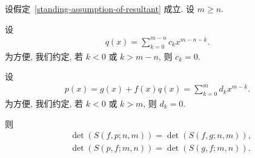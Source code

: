 \documentclass[../libro.tex]{subfiles}
\begin{document}
\begin{theorem}
    设假定~\ref{standing-assumption-of-resultant} 成立.
    设 \(m \geq n\).

    设
    \begin{align*}
        q(x) = \sum_{k = 0}^{m-n} {c_k x^{m-n-k}}.
    \end{align*}
    为方便, 我们约定,
    若 \(k < 0\) 或 \(k > m - n\), 则 \(c_k = 0\).

    设
    \begin{align*}
        p(x) = g(x) + f(x) q(x) = \sum_{k = 0}^{m} {d_k x^{m-k}}.
    \end{align*}
    为方便, 我们约定,
    若 \(k < 0\) 或 \(k > m\), 则 \(d_k = 0\).

    则
    \begin{align*}
        & \det {(S(f, p; n, m))} = \det {(S(f, g; n, m))}, \\
        & \det {(S(p, f; m, n))} = \det {(S(g, f; m, n))}.
    \end{align*}
\end{theorem}
\end{document}

